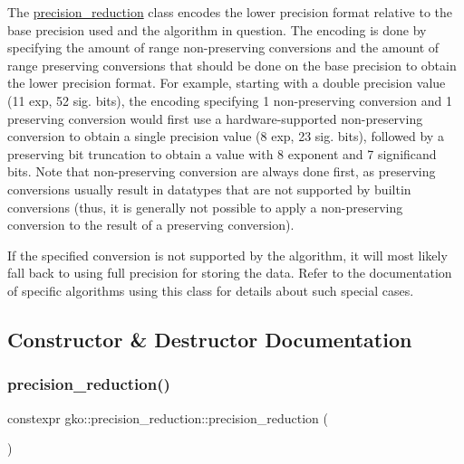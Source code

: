 The \hyperlink{classgko_1_1precision__reduction}{precision\+\_\+reduction} class encodes the lower precision format relative to the base precision used and the algorithm in question. The encoding is done by specifying the amount of range non-\/preserving conversions and the amount of range preserving conversions that should be done on the base precision to obtain the lower precision format. For example, starting with a double precision value (11 exp, 52 sig. bits), the encoding specifying 1 non-\/preserving conversion and 1 preserving conversion would first use a hardware-\/supported non-\/preserving conversion to obtain a single precision value (8 exp, 23 sig. bits), followed by a preserving bit truncation to obtain a value with 8 exponent and 7 significand bits. Note that non-\/preserving conversion are always done first, as preserving conversions usually result in datatypes that are not supported by builtin conversions (thus, it is generally not possible to apply a non-\/preserving conversion to the result of a preserving conversion).

If the specified conversion is not supported by the algorithm, it will most likely fall back to using full precision for storing the data. Refer to the documentation of specific algorithms using this class for details about such special cases. 

\subsection{Constructor \& Destructor Documentation}
\mbox{\label{classgko_1_1precision__reduction_a371fe028770edee40c013d1a45365aa2}} 
\subsubsection{\texorpdfstring{precision\+\_\+reduction()}{precision\_reduction()}\hspace{0.1cm}{\footnotesize\ttfamily [1/2]}}
{\footnotesize\ttfamily constexpr gko\+::precision\+\_\+reduction\+::precision\+\_\+reduction (\begin{DoxyParamCaption}{ }\end{DoxyParamCaption})\hspace{0.3cm}{\ttfamily [noexcept]}}



